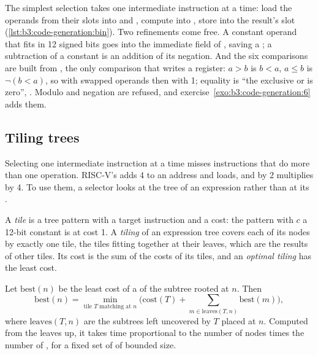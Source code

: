 The simplest selection takes one intermediate instruction at a time: load the operands from their slots into  and , compute into , store  into the result's slot (\cref{lst:b3:code-generation:bin}). Two refinements come free. A constant operand that fits in 12 signed bits goes into the immediate field of , saving a ; a subtraction of a constant is an addition of its negation. And the six comparisons are built from , the only comparison that writes a register: $a > b$ is $b < a$, $a \le b$ is $\lnot (b < a)$, so  with swapped operands then  with 1; equality is ``the exclusive or is zero'', . Modulo and negation are refused, and exercise~\ref{exo:b3:code-generation:6} adds them.

\label{lst:b3:code-generation:bin}

\subsection{Tiling trees}

Selecting one intermediate instruction at a time misses instructions that do more than one operation. RISC-V's  adds 4 to an address and loads, and  by 2 multiplies by 4. To use them, a selector looks at the tree of an expression rather than at its .

\begin{definition}\label{def:b3:code-generation:tiling}
A \emph{tile} is a tree pattern with a target instruction and a cost: the pattern  with $c$ a 12-bit constant is  at cost 1. A \emph{tiling} of an expression tree covers each of its nodes by exactly one tile, the tiles fitting together at their leaves, which are the results of other tiles. Its cost is the sum of the costs of its tiles, and an \emph{optimal tiling} has the least cost.
\end{definition}

\begin{theorem}\label{thm:b3:code-generation:tiling}
Let $\mathrm{best}(n)$ be the least cost of a  of the subtree rooted at $n$. Then
\[ \mathrm{best}(n) = \min_{\text{tile } T \text{ matching at } n} \Big( \mathrm{cost}(T) + \sum_{m \in \mathrm{leaves}(T, n)} \mathrm{best}(m) \Big), \]
where $\mathrm{leaves}(T, n)$ are the subtrees left uncovered by $T$ placed at $n$. Computed from the leaves up, it takes time proportional to the number of nodes times the number of , for a fixed set of  of bounded size.
\end{theorem}


